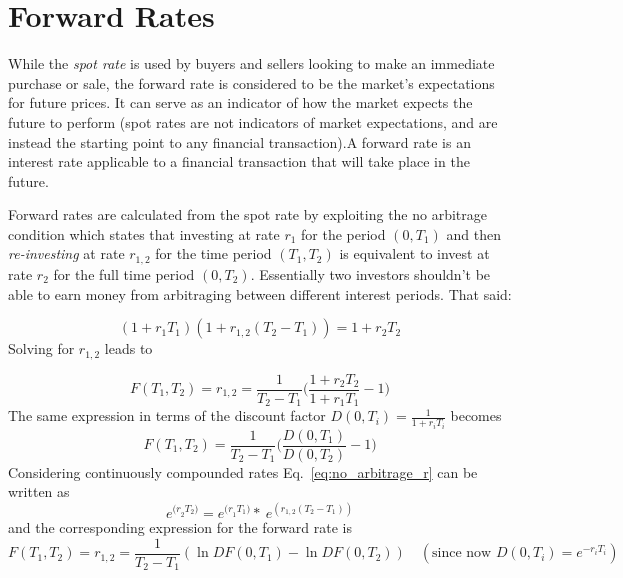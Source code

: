 \section{Forward Rates}\label{calculating-forward-rates}
While the \emph{spot rate} is used by buyers and sellers looking 
to make an immediate purchase or sale, the forward rate is considered to 
be the market's expectations for future prices. It can serve as an indicator 
of how the market expects the future to perform (spot rates are not 
indicators of market expectations, and are instead the starting point to any
financial transaction).A forward rate is an interest rate applicable to a financial transaction that will take place in the future. 

Forward rates are calculated from the spot rate by exploiting the no arbitrage condition which states that investing at rate \(r_1\) for the period \((0, T_1)\) and then \emph{re-investing} at rate \(r_{1,2}\) for the time period \((T_1, T_2)\) is equivalent to invest at rate \(r_2\) for the full time period \((0, T_2)\). Essentially two investors shouldn't be able to earn money from arbitraging between different interest periods. That said:

\begin{equation}
(1+r_1 T_1)(1+r_{1,2}(T_2 - T_1)) = 1 + r_2 T_2
\label{eq:no_arbitrage_r}
\end{equation}
Solving for \(r_{1,2}\) leads to

\begin{equation}
F(T_1, T_2) = r_{1,2} = \frac{1}{T_2 - T_1}\Big(\frac{1+r_2 T_2}{1+r_1 T_1} - 1 \Big)
\label{eq:forward_rate_simple}
\end{equation}
The same expression in terms of the discount factor $ D{(0, T_i)}=\frac{1}{1+r_iT_{i}}$ becomes
\begin{equation}
F(T_1, T_2) = \frac{1}{T_2 - T_1}\Big(\frac{D(0, T_1)}{D(0, T_2)} - 1 \Big)
\end{equation}
Considering continuously compounded rates Eq.~\ref{eq:no_arbitrage_r} can be
written as
\begin{equation}
e^{{(r}_{2}T_{2})}=e^{{(r}_{1}T_{1})}\ast \ e^{\left(r_{1,2} \left(T_{2}-T_{1}\right)\right)}
\end{equation}
and the corresponding expression for the forward rate is
\begin{equation}
F(T_1, T_2) = r_{1,2} = \frac {1}{T_{2}-T_{1}}(\ln DF(0,T_{1})-\ln DF(0,T_{2}))
\quad(\textrm{since now } D(0, T_i)=e^{-r_i T_i})
\label{eq:forward_rate_continous}
\end{equation}

